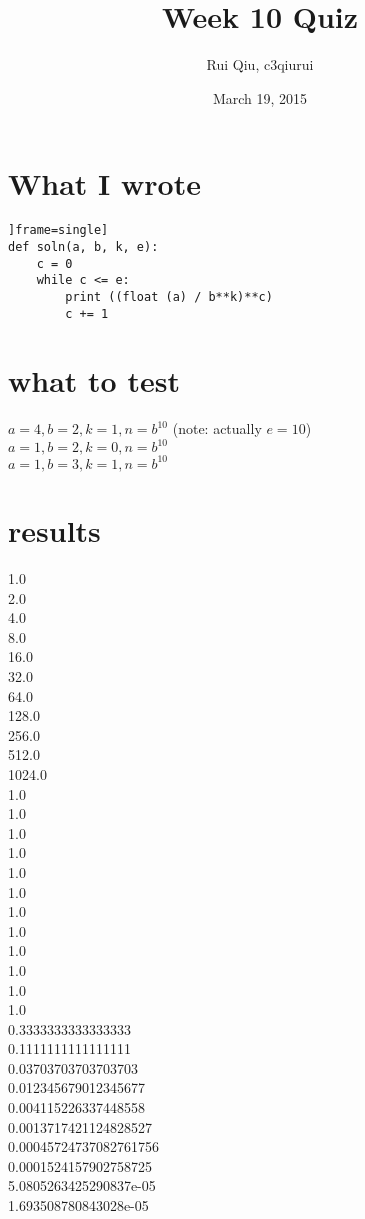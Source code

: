 \documentclass{article}
\title{Week 10 Quiz}
\author{Rui Qiu, c3qiurui}
\date{March 19, 2015}
\begin{document}
\maketitle

\section{What I wrote}

\lstset{language=Python}

\begin{lstlisting}]frame=single]
def soln(a, b, k, e):
    c = 0
    while c <= e:
        print ((float (a) / b**k)**c)
        c += 1
\end{lstlisting}

\section{what to test}
 $a=4, b=2, k=1, n=b^10$ (note: actually $e=10$)\\
 $a=1, b=2, k=0, n=b^10$\\
 $a=1, b=3, k=1, n=b^10$

 \section{results}
 1.0\\
2.0\\
4.0\\
8.0\\
16.0\\
32.0\\
64.0\\
128.0\\
256.0\\
512.0\\
1024.0\\
1.0\\
1.0\\
1.0\\
1.0\\
1.0\\
1.0\\
1.0\\
1.0\\
1.0\\
1.0\\
1.0\\
1.0\\
0.3333333333333333\\
0.1111111111111111\\
0.03703703703703703\\
0.012345679012345677\\
0.004115226337448558\\
0.0013717421124828527\\
0.00045724737082761756\\
0.0001524157902758725\\
5.0805263425290837e-05\\
1.693508780843028e-05
\end{document}
